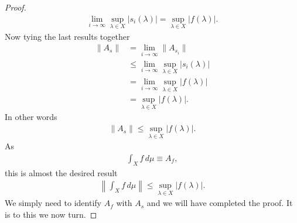 \begin{proof}
\begin{align}
    \lim_{i \rightarrow \infty} \sup_{\lambda \in X} \lvert s_i(\lambda) \rvert = \sup_{\lambda \in X} \lvert f(\lambda) \rvert.
\end{align}
Now tying the last results together
\begin{align}
    \|A_s\| &=   \lim_{i \rightarrow \infty} \| A_{s_i} \| \\
            &\le \lim_{i \rightarrow \infty} \sup_{\lambda \in X} \lvert s_i(\lambda) \rvert \\
            &= \lim_{i \rightarrow \infty} \sup_{\lambda \in X} \lvert f(\lambda) \rvert \\
            &= \sup_{\lambda \in X} \lvert f(\lambda) \rvert.
\end{align}
In other words
\begin{align}
    \|A_s\| \le \sup_{\lambda \in X} \lvert f(\lambda) \rvert.
\end{align}
As
\begin{align}
    \int_X f \, d\mu \equiv A_f,
\end{align}
this is almost the desired result
\begin{align}
    \left\| \int_X f \, d\mu \right\| \le \sup_{\lambda \in X} \lvert f(\lambda) \rvert.
\end{align}
We simply need to identify $A_f$ with $A_s$ and we will have completed the proof. It is to this we now turn.


\end{proof}
